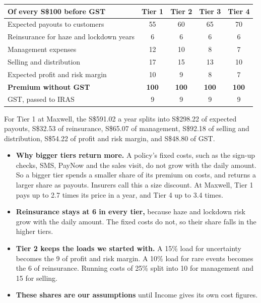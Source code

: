 \documentclass[11pt,a4paper]{article}
\newcommand{\head}{\rowcolor{soft}}
\newcommand{\sgd}{\textup{S\$}}
\begin{document}
\begin{center}
\small
\begin{tabular}{|l|c|c|c|c|}
\hline
\head \textbf{Of every \sgd 100 before GST} & \textbf{Tier 1} & \textbf{Tier 2} & \textbf{Tier 3} & \textbf{Tier 4} \\
\hline
Expected payouts to customers & 55 & 60 & 65 & 70 \\
\hline
Reinsurance for haze and lockdown years & 6 & 6 & 6 & 6 \\
\hline
Management expenses & 12 & 10 & 8 & 7 \\
\hline
Selling and distribution & 17 & 15 & 13 & 10 \\
\hline
Expected profit and risk margin & 10 & 9 & 8 & 7 \\
\hline
\textbf{Premium without GST} & \textbf{100} & \textbf{100} & \textbf{100} & \textbf{100} \\
\hline
GST, passed to IRAS & 9 & 9 & 9 & 9 \\
\hline
\end{tabular}
\end{center}

For Tier 1 at Maxwell, the \sgd 591.02 a year splits into \sgd 298.22 of expected payouts, \sgd 32.53 of reinsurance, \sgd 65.07 of management, \sgd 92.18 of selling and distribution, \sgd 54.22 of profit and risk margin, and \sgd 48.80 of GST.

\begin{itemize}[leftmargin=1.2em]
  \item \textbf{Why bigger tiers return more.} A policy's fixed costs, such as the sign-up checks, SMS, PayNow and the sales visit, do not grow with the daily amount. So a bigger tier spends a smaller share of its premium on costs, and returns a larger share as payouts. Insurers call this a size discount. At Maxwell, Tier 1 pays up to 2.7 times its price in a year, and Tier 4 up to 3.4 times.
  \item \textbf{Reinsurance stays at 6 in every tier,} because haze and lockdown risk grow with the daily amount. The fixed costs do not, so their share falls in the higher tiers.
  \item \textbf{Tier 2 keeps the loads we started with.} A 15\% load for uncertainty becomes the 9 of profit and risk margin. A 10\% load for rare events becomes the 6 of reinsurance. Running costs of 25\% split into 10 for management and 15 for selling.
  \item \textbf{These shares are our assumptions} until Income gives its own cost figures.
\end{itemize}
\end{document}
